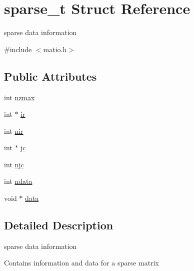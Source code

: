 \hypertarget{structsparse__t}{\section{sparse\-\_\-t Struct Reference}
\label{structsparse__t}
}


sparse data information  




{\ttfamily \#include $<$matio.\-h$>$}

\subsection*{Public Attributes}
\begin{DoxyCompactItemize}
\item 
int \hyperlink{structsparse__t_afd116055ad6a18c27b80333fdac45827}{nzmax}
\item 
int $\ast$ \hyperlink{structsparse__t_ae3b4cd31e90bb824e9b00f7c3dec7af4}{ir}
\item 
int \hyperlink{structsparse__t_a6aa1a08cc2760a36771edd65df8cf111}{nir}
\item 
int $\ast$ \hyperlink{structsparse__t_aeea61c5d15e5cc015a8baf55cc130ee1}{jc}
\item 
int \hyperlink{structsparse__t_aa0ef6a0c8be3ad0e3a222371e68f7dd4}{njc}
\item 
int \hyperlink{structsparse__t_ab692009004070fda2da8274767a0788d}{ndata}
\item 
void $\ast$ \hyperlink{structsparse__t_a8194f9468a7d77514db5ed70b54017bb}{data}
\end{DoxyCompactItemize}


\subsection{Detailed Description}
sparse data information 

Contains information and data for a sparse matrix 

